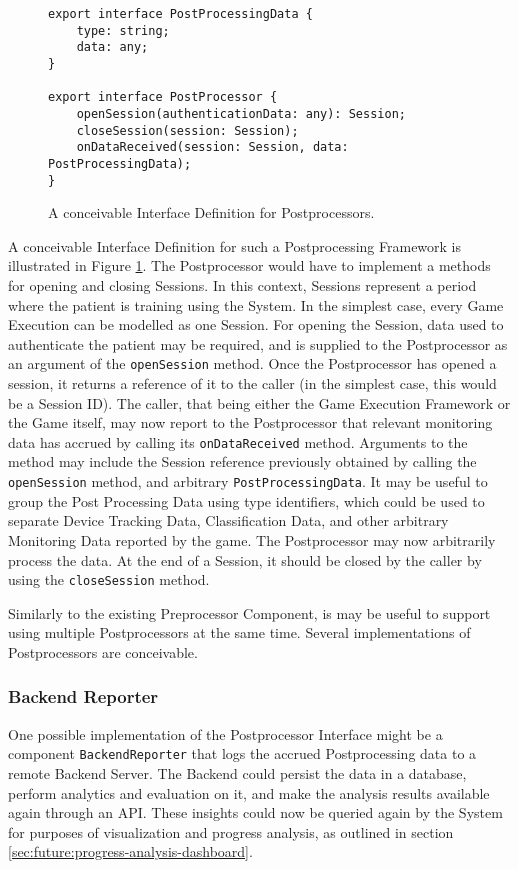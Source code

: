 \begin{figure}
\begin{verbatim}
export interface PostProcessingData {
    type: string;
    data: any;
}

export interface PostProcessor {
    openSession(authenticationData: any): Session;
    closeSession(session: Session);
    onDataReceived(session: Session, data: PostProcessingData);
}
\end{verbatim}
\caption{A conceivable Interface Definition for Postprocessors.}
\label{fig:postprocessors}
\end{figure}

A conceivable Interface Definition for such a Postprocessing Framework is illustrated in Figure \ref{fig:postprocessors}. The Postprocessor would have to implement a methods for opening and closing Sessions. In this context, Sessions represent a period where the patient is training using the System. In the simplest case, every Game Execution can be modelled as one Session. For opening the Session, data used to authenticate the patient may be required, and is supplied to the Postprocessor as an argument of the \texttt{openSession} method. Once the Postprocessor has opened a session, it returns a reference of it to the caller (in the simplest case, this would be a Session ID). The caller, that being either the Game Execution Framework or the Game itself, may now report to the Postprocessor that relevant monitoring data has accrued by calling its \texttt{onDataReceived} method. Arguments to the method may include the Session reference previously obtained by calling the \texttt{openSession} method, and arbitrary \texttt{PostProcessingData}. It may be useful to group the Post Processing Data using type identifiers, which could be used to separate Device Tracking Data, Classification Data, and other arbitrary Monitoring Data reported by the game. The Postprocessor may now arbitrarily process the data. At the end of a Session, it should be closed by the caller by using the \texttt{closeSession} method.

Similarly to the existing Preprocessor Component, is may be useful to support using multiple Postprocessors at the same time. Several implementations of Postprocessors are conceivable.

\subsubsection{Backend Reporter}
\label{sec:future:backend-reporter}
One possible implementation of the Postprocessor Interface might be a component \texttt{BackendReporter} that logs the accrued Postprocessing data to a remote Backend Server. The Backend could persist the data in a database, perform analytics and evaluation on it, and make the analysis results available again through an API. These insights could now be queried again by the System for purposes of visualization and progress analysis, as outlined in section \ref{sec:future:progress-analysis-dashboard}.

